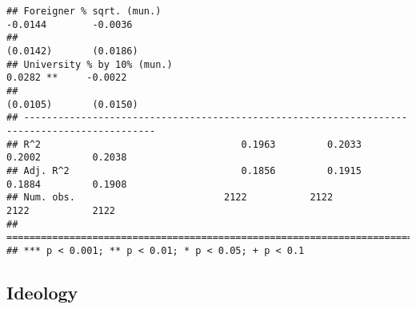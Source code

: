 \documentclass[
]{article}
\begin{document}
\begin{verbatim}
## Foreigner % sqrt. (mun.)                                           -0.0144        -0.0036    
##                                                                    (0.0142)       (0.0186)   
## University % by 10% (mun.)                                          0.0282 **     -0.0022    
##                                                                    (0.0105)       (0.0150)   
## ---------------------------------------------------------------------------------------------
## R^2                                   0.1963         0.2033         0.2002         0.2038    
## Adj. R^2                              0.1856         0.1915         0.1884         0.1908    
## Num. obs.                          2122           2122           2122           2122         
## =============================================================================================
## *** p < 0.001; ** p < 0.01; * p < 0.05; + p < 0.1
\end{verbatim}

\hypertarget{ideology-2}{%
\subsection{Ideology}\label{ideology-2}}
\end{document}
